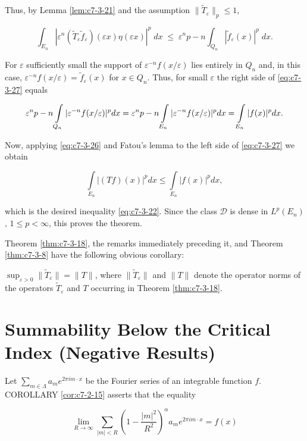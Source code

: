 Thus, by Lemma \ref{lem:c7-3-21} and the assumption $\|\tilde{T}_{\varepsilon}\|_{p} \leq 1$,

\begin{equation}\label{eq:c7-3-27}
\int_{{E}_{n}}|\varepsilon^{n}(\widetilde{T}_{\varepsilon}\widetilde{f}_{\varepsilon})(\varepsilon x)\eta(\varepsilon x)|^{p}\;{d}x\;\leq\;\varepsilon^np-n\int_{{Q}_{n}}|\widetilde{f}_{\varepsilon}(x)|^{p}\;{d}x.
\end{equation}

For $\varepsilon$ sufficiently small the support of $\varepsilon^{-n}f(x/\varepsilon)$ lies entirely in $Q_n$ and, in this case, $\varepsilon^{-n}f(x/\varepsilon) = \tilde{f}_{\varepsilon}(x)$ for $x \in Q_n$. Thus, for small $\varepsilon$ the right side of \eqref{eq:c7-3-27} equals

\[
\varepsilon^np-n\intop_{Q_{n}}|\varepsilon^{-n}f(x/\varepsilon)|^{p}d x=\varepsilon^np-n\intop_{E_{n}}|\varepsilon^{-n}f(x/\varepsilon)|^{p}d x=\intop_{E_{n}}|f(x)|^{p}d x.
\]

Now, applying \eqref{eq:c7-3-26} and Fatou's lemma to the left side of \eqref{eq:c7-3-27} we obtain

\[
\int\limits_{E_{n}}\left|(T f)(x)\right|^{p}d x\leq\int\limits_{E_{n}}\left|f(x)\right|^{p}d x,
\]

which is the desired inequality \eqref{eq:c7-3-22}. Since the class $\mathcal{D}$ is dense in $L^p(E_n)$, $1 \leq p < \infty$, this proves the theorem.

Theorem \ref{thm:c7-3-18}, the remarks immediately preceding it, and Theorem \ref{thm:c7-3-8} have the following obvious corollary:

\begin{corollary}
\label{cor:c7-3-28}
$\sup_{\varepsilon>0} \|\tilde{T}_\varepsilon\| = \|T\|$, where $\|\tilde{T}_\varepsilon\|$ and $\|T\|$ denote the operator norms of the operators $\tilde{T}_\varepsilon$ and $T$ occurring in Theorem \ref{thm:c7-3-18}.
\end{corollary}

\section{Summability Below the Critical Index (Negative Results)}

Let $\sum_{m \in \Lambda} a_m e^{2\pi i m \cdot x}$ be the Fourier series of an integrable function $f$. COROLLARY \eqref{cor:c7-2-15} asserts that the equality

\begin{equation}\label{eq:c7-4-1}
\lim_{R\to\infty}\sum_{|m|<R}\left(1-\frac{|m|^{2}}{R^{2}}\right)^\alpha a_{m} e^{2\pi i m\cdot x}=f(x)
\end{equation}

